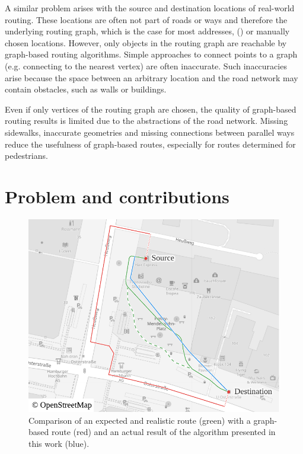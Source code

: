	A similar problem arises with the source and destination locations of real-world routing.
	These locations are often not part of roads or ways and therefore the underlying routing graph, which is the case for most addresses,  () or manually chosen locations.
	However, only objects in the routing graph are reachable by graph-based routing algorithms.
	Simple approaches to connect points to a graph (e.g. connecting to the nearest vertex) are often inaccurate.
	Such inaccuracies arise because the space between an arbitrary location and the road network may contain obstacles, such as walls or buildings.
	
	Even if only vertices of the routing graph are chosen, the quality of graph-based routing results is limited due to the abstractions of the road network.
	Missing sidewalks, inaccurate geometries and missing connections between parallel ways reduce the usefulness of graph-based routes, especially for routes determined for pedestrians.
	
	\section{Problem and contributions}
	
	\begin{figure}
		\begin{figcenter}
			\includegraphics[width=\linewidth]{images/qgis-routing-osterstrasse}
		\end{figcenter}
		\caption[Comparison of normal routing with hybrid visibility routing.]{Comparison of an expected and realistic route (green) with a graph-based route (red) and an actual result of the algorithm presented in this work (blue).}
		\label{fig:osterstrasse-routing-vs-expected}
	\end{figure}
	
